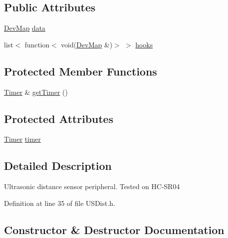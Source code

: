 \subsection*{Public Attributes}
\begin{DoxyCompactItemize}
\item 
\mbox{\hyperlink{Perif_8hpp_a358ff4ee6d24694ee7661f0cce14377e}{Dev\+Map}} \mbox{\hyperlink{classperif_1_1PerifBase_a1a3afaa535fda17e9f97123fffe78765}{data}}
\item 
list$<$ function$<$ void(\mbox{\hyperlink{Perif_8hpp_a358ff4ee6d24694ee7661f0cce14377e}{Dev\+Map}} \&)$>$ $>$ \mbox{\hyperlink{classperif_1_1PerifBase_a98964e5ca8384df64881265e0aa6d7b6}{hooks}}
\end{DoxyCompactItemize}
\subsection*{Protected Member Functions}
\begin{DoxyCompactItemize}
\item 
\mbox{\hyperlink{classTimer}{Timer}} \& \mbox{\hyperlink{classperif_1_1Perif_a29c48598a861d85256c30e28af67f864}{get\+Timer}} ()
\end{DoxyCompactItemize}
\subsection*{Protected Attributes}
\begin{DoxyCompactItemize}
\item 
\mbox{\hyperlink{classTimer}{Timer}} \mbox{\hyperlink{classperif_1_1Perif_acfa1256201bead82ccce1a0a8bcc24e1}{timer}}
\end{DoxyCompactItemize}


\subsection{Detailed Description}
Ultrasonic distance sensor peripheral. Tested on H\+C-\/\+S\+R04 

Definition at line 35 of file U\+S\+Dist.\+h.



\subsection{Constructor \& Destructor Documentation}
\mbox{\label{classperif_1_1USDist_a56e837dd1ef2de47ae628f56f241ad04}} 
